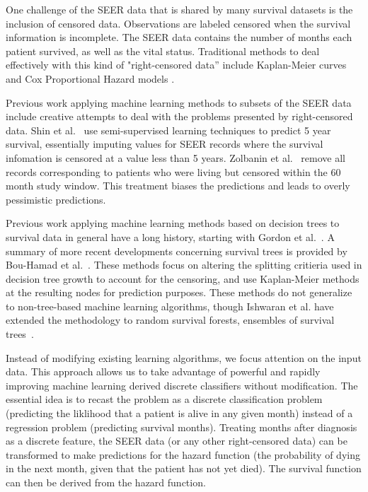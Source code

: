 \documentclass[10pt,letterpaper]{article}
\begin{document}
One challenge of the SEER data that is shared by many survival datasets is the inclusion of censored data.
Observations are labeled censored when the survival information is incomplete.
 The SEER data contains the number of months each patient survived, as well as the vital status.
Traditional methods to deal effectively with this kind of "right-censored data'' include Kaplan-Meier curves
and Cox Proportional Hazard models \cite{cam}. 


Previous work applying machine learning methods to subsets of the SEER data include creative attempts to deal with the problems presented by right-censored data. Shin et al.~\cite{ISI:000337467400005} use semi-supervised learning techniques to predict 5 year survival, essentially imputing values for SEER records where the survival infomation is censored at a value less than 5 years. Zolbanin et al.~\cite{ISI:000355882700012} remove all records corresponding to patients who were living but censored within the 60 month study window. This treatment biases the predictions and leads to overly pessimistic predictions. 



Previous work applying machine learning methods based on decision trees to survival data in general have a long history, starting with Gordon et al.~\cite{Gordon19851065}. A summary of more recent developments concerning survival trees is provided by Bou-Hamad et al.~\cite{Bou-Hamad201144}. These methods focus on altering the splitting critieria used in decision tree growth to account for the censoring, and use Kaplan-Meier methods at the resulting nodes for prediction purposes. These methods do not generalize to non-tree-based machine learning algorithms, though Ishwaran et al. have extended the methodology to random survival forests, ensembles of survival trees~\cite{Ishwaran20101056}.



 Instead of modifying existing learning algorithms, we focus attention on the input data. This approach allows us to take advantage of powerful and rapidly improving machine learning derived discrete classifiers without modification. 
 The essential idea is to recast the problem as a discrete classification problem (predicting the liklihood that a patient is alive in any given month) instead of a regression problem (predicting survival months). Treating months after diagnosis as a discrete feature, the SEER data (or any other right-censored data) can be transformed to make predictions for the hazard function (the probability of dying in the next month, given that the patient has not yet died).
The survival function can then be derived from the hazard function.
\end{document}
